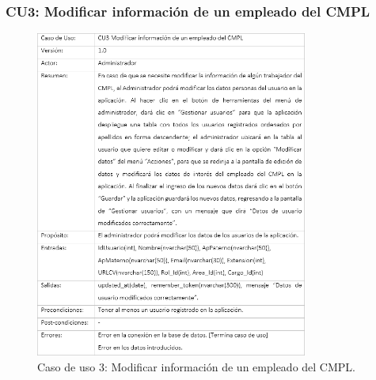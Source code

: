 \newpage

		\subsubsection{CU3: Modificar información de un empleado del CMPL}
			\begin{figure}[htbp!]
				\centering
					\includegraphics[width=0.8\textwidth]{images/CU/CU3}
					\caption{Caso de uso 3: Modificar información de un empleado del CMPL.}
				\label{Tabla}
			\end{figure}
			
